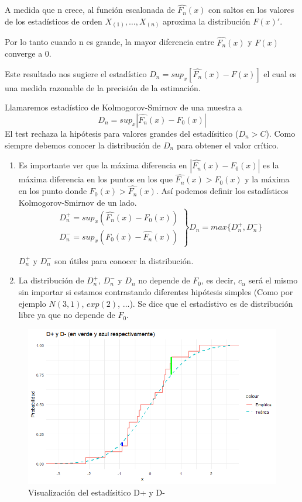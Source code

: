 A medida que n crece, al función escalonada de $\widehat{F_n}(x)$ con saltos en los valores de los estadísticos de orden $X_{(1)},\dots,X_{(n)}$ aproxima la distribución $F(x)'$.  %

Por lo tanto cuando n es grande, la mayor diferencia entre $\widehat{F_n}(x)$ y $F(x)$ converge a 0.

Este resultado nos sugiere el estadístico $D_n=sup_x[\widehat{F_n}(x)-F(x)]$ el cual es una medida razonable de la precisión de la estimación.

Llamaremos estadístico de Kolmogorov-Smirnov de una muestra a
\[
    D_n=sup_x|\widehat{F_n}(x)-F_0(x)|
\]
El test rechaza la hipótesis para valores grandes del estadísitico ($D_n>C$).
Como siempre debemos conocer la distribución de $D_n$ para obtener el valor crítico.

\begin{enumerate}
    \item Es importante ver que la máxima diferencia en $|\widehat{F_n}(x)-F_0(x)|$ es la máxima 
    diferencia en los puntos en los que $\widehat{F_n}(x)>F_0(x)$ y la máxima en los punto donde $F_0(x)>\widehat{F_n}(x)$. 
    Así podemos definir los estadísticos Kolmogorov-Smirnov de un lado.
    \[
        \left.\begin{matrix}
                D_n^+=sup_x(\widehat{F_n}(x)-F_0(x)) \\
                D_n^-=sup_x(F_0(x)-\widehat{F_n}(x))
        \end{matrix}\right\}
        D_n=max\{D_n^+,D_n^-\}
    \]
            
    $D_n^+$ y $D_n^-$ son útiles para conocer la distribución.

    \item La distribución de $D_n^+$, $D_n^-$ y $D_n$ no depende de $F_0$, es decir, $c_\alpha$ será el mismo sin importar si estamos contrastando diferentes hipótesis simples (Como por ejemplo $N(3,1)$, $exp(2)$, $\dots$). Se dice que el estadístivo es de distribución libre ya que no depende de $F_0$.
\end{enumerate}

\begin{figure}[h!]
    \centering
    \includegraphics[width=\textwidth]{assets/Tema4/EjemploD.png}
    \caption{Visualización del estadísitico D+ y D-}
    \label{fig:Dplus_Dminus}
\end{figure}

